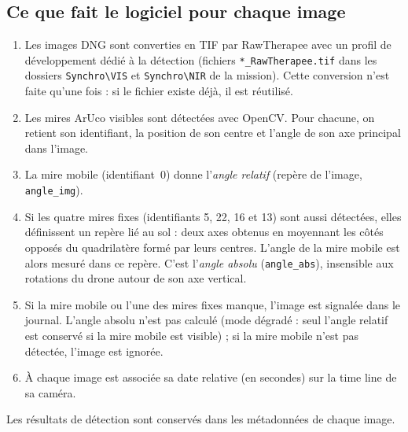 \documentclass[a4paper,11pt]{report}
\begin{document}
\subsection*{Ce que fait le logiciel pour chaque image}
\begin{enumerate}
  \item Les images DNG sont converties en TIF par RawTherapee avec un profil de développement dédié à la détection (fichiers \texttt{*\_RawTherapee.tif} dans les dossiers \texttt{Synchro\textbackslash VIS} et \texttt{Synchro\textbackslash NIR} de la mission). Cette conversion n'est faite qu'une fois : si le fichier existe déjà, il est réutilisé.
  \item Les mires ArUco visibles sont détectées avec OpenCV. Pour chacune, on retient son identifiant, la position de son centre et l'angle de son axe principal dans l'image.
  \item La mire mobile (identifiant~0) donne l'\emph{angle relatif} (repère de l'image, \texttt{angle\_img}).
  \item Si les quatre mires fixes (identifiants 5, 22, 16 et 13) sont aussi détectées, elles définissent un repère lié au sol : deux axes obtenus en moyennant les côtés opposés du quadrilatère formé par leurs centres. L'angle de la mire mobile est alors mesuré dans ce repère. C'est l'\emph{angle absolu} (\texttt{angle\_abs}), insensible aux rotations du drone autour de son axe vertical.
  \item Si la mire mobile ou l'une des mires fixes manque, l'image est signalée dans le journal. L'angle absolu n'est pas calculé (mode dégradé : seul l'angle relatif est conservé si la mire mobile est visible) ; si la mire mobile n'est pas détectée, l'image est ignorée.
  \item À chaque image est associée sa date relative (en secondes) sur la time line de sa caméra.
\end{enumerate}
Les résultats de détection sont conservés dans les métadonn\'ees de chaque image.
\end{document}
